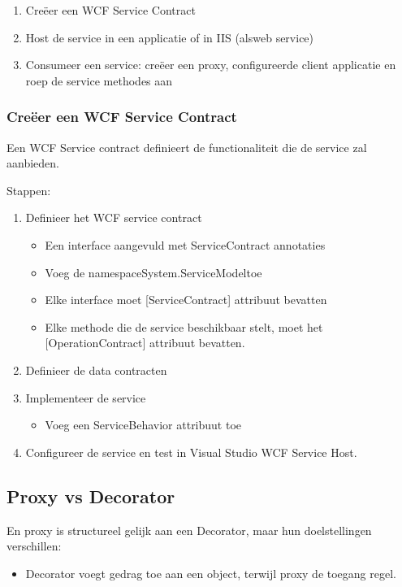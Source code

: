 \documentclass[a4paper,12pt]{article}
\begin{document}
\begin{enumerate}
\item Creëer een WCF Service Contract
\item Host de service in een applicatie of in IIS (alsweb service)
\item Consumeer een service: creëer een proxy, configureerde client applicatie en roep de service methodes aan
\end{enumerate}

\subsubsection{Creëer een WCF Service Contract}
Een WCF Service contract definieert de functionaliteit die de service zal aanbieden.

Stappen:
\begin{enumerate}
\item Definieer het WCF service contract
	\begin{itemize}
	\item Een interface aangevuld met ServiceContract annotaties
	\item Voeg de namespaceSystem.ServiceModeltoe
	\item Elke interface moet [ServiceContract] attribuut bevatten
	\item Elke methode die de service beschikbaar stelt, moet het [OperationContract] attribuut bevatten.
	\end{itemize}
\item Definieer de data contracten
\item Implementeer de service
	\begin{itemize}
	\item Voeg een ServiceBehavior attribuut toe
	\end{itemize}
\item Configureer de service en test in Visual Studio WCF Service Host.
\end{enumerate}

\subsection{Proxy vs Decorator}
En proxy is structureel gelijk aan een Decorator, maar hun doelstellingen verschillen:
\begin{itemize}
\item Decorator voegt gedrag toe aan een object, terwijl proxy de toegang regel.
\end{itemize}
\end{document}
